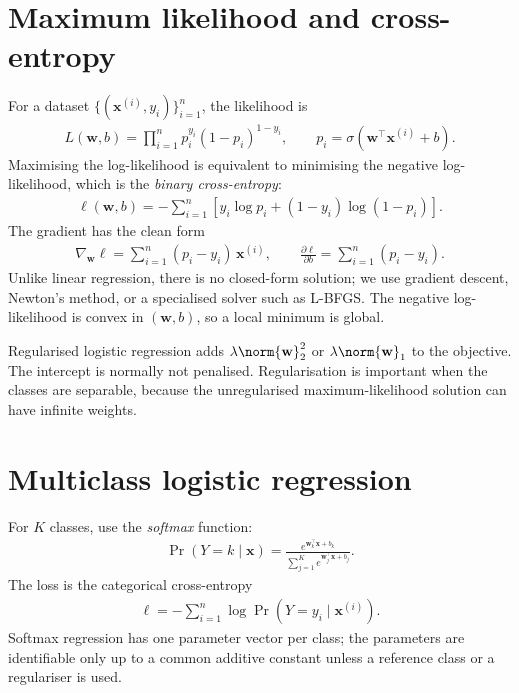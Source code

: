 \documentclass[a4paper, 12pt]{book}
\begin{document}
\section{Maximum likelihood and cross-entropy}

For a dataset $\{(\mathbf{x}^{(i)},y_i)\}_{i=1}^n$, the likelihood is
\begin{align}
    L(\mathbf{w},b)
    = \prod_{i=1}^n p_i^{y_i}(1-p_i)^{1-y_i},
    \qquad p_i = \sigma(\mathbf{w}^\top\mathbf{x}^{(i)}+b).
\end{align}
Maximising the log-likelihood is equivalent to minimising the negative
log-likelihood, which is the \emph{binary cross-entropy}:
\begin{align}
    \ell(\mathbf{w},b)
    = -\sum_{i=1}^n \left[
      y_i \log p_i + (1-y_i)\log(1-p_i)
    \right].
\end{align}
The gradient has the clean form
\begin{align}
    \nabla_{\mathbf{w}} \ell
    = \sum_{i=1}^n (p_i - y_i)\,\mathbf{x}^{(i)},
    \qquad
    \frac{\partial \ell}{\partial b}
    = \sum_{i=1}^n (p_i - y_i).
\end{align}
Unlike linear regression, there is no closed-form solution; we use gradient descent,
Newton's method, or a specialised solver such as L-BFGS. The negative log-likelihood
is convex in $(\mathbf{w},b)$, so a local minimum is global.

Regularised logistic regression adds $\lambda\norm{\mathbf{w}}_2^2$ or
$\lambda\norm{\mathbf{w}}_1$ to the objective. The intercept is normally not
penalised. Regularisation is important when the classes are separable, because the
unregularised maximum-likelihood solution can have infinite weights.

\section{Multiclass logistic regression}

For $K$ classes, use the \emph{softmax} function:
\begin{align}
    \Pr(Y=k\mid\mathbf{x})
    = \frac{e^{\mathbf{w}_k^\top\mathbf{x}+b_k}}
           {\sum_{j=1}^K e^{\mathbf{w}_j^\top\mathbf{x}+b_j}}.
\end{align}
The loss is the categorical cross-entropy
\begin{align}
    \ell = -\sum_{i=1}^n \log \Pr(Y=y_i\mid\mathbf{x}^{(i)}).
\end{align}
Softmax regression has one parameter vector per class; the parameters are
identifiable only up to a common additive constant unless a reference class or a
regulariser is used.
\end{document}
